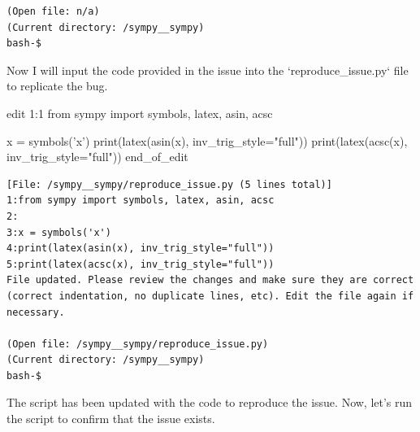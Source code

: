 {\begin{observationbox}
\begin{Verbatim}[breaklines=true, breakanywhere=true]
(Open file: n/a)
(Current directory: /sympy__sympy)
bash-$
\end{Verbatim}
\end{observationbox}
\begin{agentbox}
Now I will input the code provided in the issue into the `reproduce\_issue.py` file to replicate the bug.



\hrulefill
\begin{CodeVerbatim}[breaklines=true, breakanywhere=true]
edit 1:1
from sympy import symbols, latex, asin, acsc

x = symbols('x')
print(latex(asin(x), inv_trig_style="full"))
print(latex(acsc(x), inv_trig_style="full"))
end_of_edit
\end{CodeVerbatim}
\end{agentbox}
\begin{observationbox}\begin{Verbatim}[breaklines=true, breakanywhere=true]
[File: /sympy__sympy/reproduce_issue.py (5 lines total)]
1:from sympy import symbols, latex, asin, acsc
2:
3:x = symbols('x')
4:print(latex(asin(x), inv_trig_style="full"))
5:print(latex(acsc(x), inv_trig_style="full"))
File updated. Please review the changes and make sure they are correct (correct indentation, no duplicate lines, etc). Edit the file again if necessary.

(Open file: /sympy__sympy/reproduce_issue.py)
(Current directory: /sympy__sympy)
bash-$
\end{Verbatim}
\end{observationbox}
\begin{agentbox}
The script has been updated with the code to reproduce the issue. Now, let's run the script to confirm that the issue exists.




\end{agentbox}}
